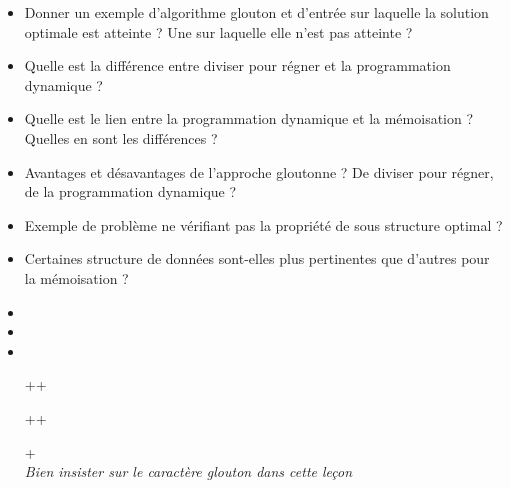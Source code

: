 \documentclass{agregfiche}
\begin{document}
\secquestionsclassiques

\begin{itemize}
    \item Donner un exemple d'algorithme glouton et d'entrée sur
    laquelle la solution optimale est atteinte ? Une sur laquelle
    elle n'est pas atteinte ?
    \item Quelle est la différence entre diviser pour régner et la programmation dynamique ?
    \item Quelle est le lien entre la programmation dynamique et la mémoisation ? Quelles en sont les différences ?
    \item Avantages et désavantages de l'approche gloutonne ? De diviser pour régner, de la programmation dynamique ?
    \item Exemple de problème ne vérifiant pas la propriété de sous
    structure optimal ?
    \item Certaines structure de données sont-elles plus pertinentes
    que d'autres pour la mémoisation ?
\end{itemize}

\secreferences

\begin{itemize}
    \item 
    \item 
    \item 
\end{itemize}

\secdev

\begin{itemize}
    \item[++] 
    \item[++] 
    \item[+] 
      \textit{\\Bien insister sur le caractère glouton dans cette 
      leçon}
\end{itemize}
\end{document}
